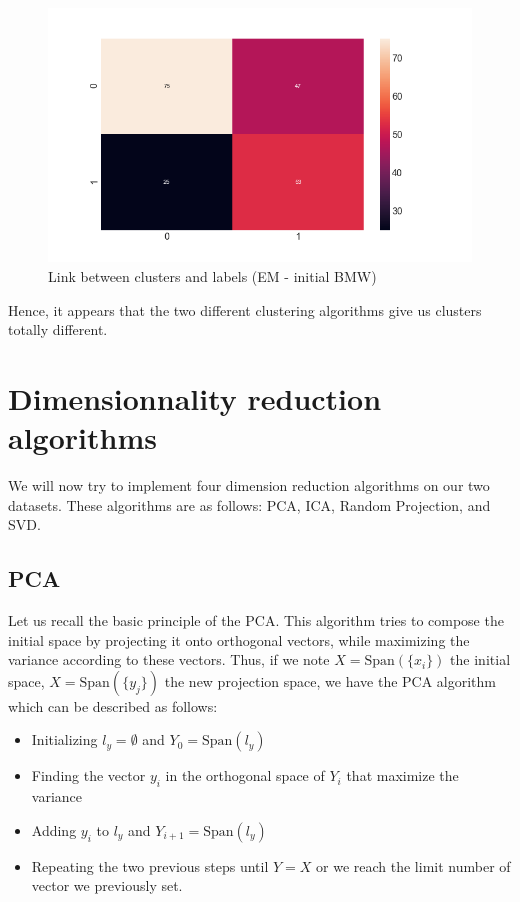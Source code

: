 \documentclass[15pt]{article}
\begin{document}
\begin{multicols}{2}
\begin{figure}[H]
\centering
\includegraphics[width = \columnwidth]{grHOSgaus.png}
\caption{Link between clusters and labels (EM - initial BMW)}
\end{figure}

Hence, it appears that the two different clustering algorithms give us clusters totally different.

\section{Dimensionnality reduction algorithms}

We will now try to implement four dimension reduction algorithms on our two datasets. These algorithms are as follows: PCA, ICA, Random Projection, and SVD.

\subsection{PCA}

Let us recall the basic principle of the PCA. This algorithm tries to compose the initial space by projecting it onto orthogonal vectors, while maximizing the variance according to these vectors. Thus, if we note $X=\text{Span}\left(\{ x_i \} \right)$ the initial space, $X=\text{Span}\left(\{ y_j \} \right)$ the new projection space, we have the PCA algorithm which can be described as follows: 
\begin{itemize}
\item Initializing $l_y = \emptyset$ and $Y_0 = \text{Span}\left( l_y \right) $
\item Finding the vector $y_i$ in the orthogonal space of $Y_i$ that maximize the variance
\item Adding $y_i$ to $l_y$ and $Y_{i+1} =  \text{Span}\left( l_y \right)$
\item Repeating the two previous steps until $Y = X$ or we reach the limit number of vector we previously set.
\end{itemize}


\end{multicols}
\end{document}
